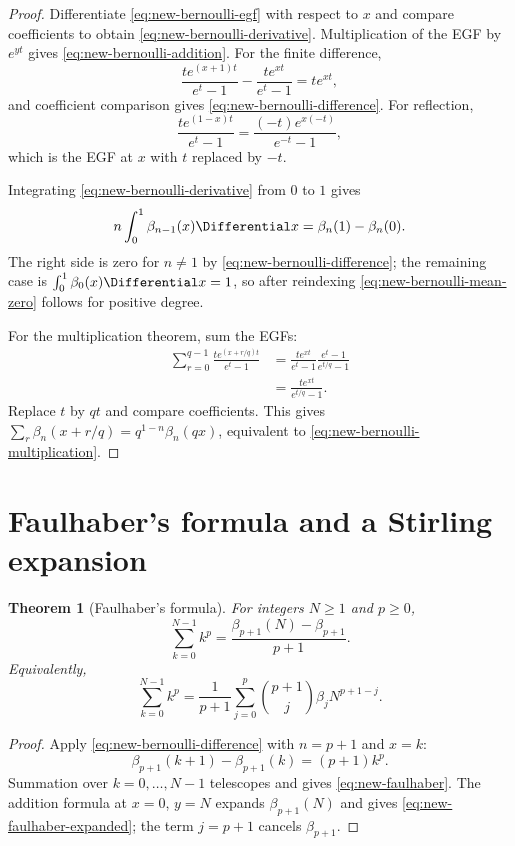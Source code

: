 \documentclass[11pt,a4paper,oneside,openany]{book}
\newtheorem{theorem}{Theorem}[chapter]
\theoremstyle{definition}
\theoremstyle{remark}
\begin{document}
\begin{proof}
Differentiate \eqref{eq:new-bernoulli-egf} with respect to $x$ and compare
coefficients to obtain \eqref{eq:new-bernoulli-derivative}.  Multiplication of
the EGF by $e^{yt}$ gives \eqref{eq:new-bernoulli-addition}.  For the finite
difference,
\[
 \frac{t e^{(x+1)t}}{e^t-1}-\frac{t e^{xt}}{e^t-1}=te^{xt},
\]
and coefficient comparison gives \eqref{eq:new-bernoulli-difference}.  For
reflection,
\[
 \frac{t e^{(1-x)t}}{e^t-1}
 =\frac{(-t)e^{x(-t)}}{e^{-t}-1},
\]
which is the EGF at $x$ with $t$ replaced by $-t$.

Integrating \eqref{eq:new-bernoulli-derivative} from $0$ to $1$ gives
\[
 n\int_0^1\beta_{n-1}(x)\Differential x=\beta_n(1)-\beta_n(0).
\]
The right side is zero for $n\ne1$ by
\eqref{eq:new-bernoulli-difference}; the remaining case is
$\int_0^1\beta_0(x)\Differential x=1$, so after reindexing
\eqref{eq:new-bernoulli-mean-zero} follows for positive degree.

For the multiplication theorem, sum the EGFs:
\begin{align*}
 \sum_{r=0}^{q-1}\frac{t e^{(x+r/q)t}}{e^t-1}
 &=\frac{t e^{xt}}{e^t-1}
   \frac{e^t-1}{e^{t/q}-1}\\
 &=\frac{t e^{xt}}{e^{t/q}-1}.
\end{align*}
Replace $t$ by $qt$ and compare coefficients.  This gives
$\sum_r\beta_n(x+r/q)=q^{1-n}\beta_n(qx)$, equivalent to
\eqref{eq:new-bernoulli-multiplication}.
\end{proof}

\section{Faulhaber's formula and a Stirling expansion}

\begin{theorem}[Faulhaber's formula]\label{thm:new-faulhaber}
For integers $N\ge1$ and $p\ge0$,
\begin{equation}\label{eq:new-faulhaber}
 \sum_{k=0}^{N-1}k^p
 =\frac{\beta_{p+1}(N)-\beta_{p+1}}{p+1}.
\end{equation}
Equivalently,
\begin{equation}\label{eq:new-faulhaber-expanded}
 \sum_{k=0}^{N-1}k^p
 =\frac1{p+1}\sum_{j=0}^{p}
 \binom{p+1}{j}\beta_jN^{p+1-j}.
\end{equation}
\end{theorem}

\begin{proof}
Apply \eqref{eq:new-bernoulli-difference} with $n=p+1$ and $x=k$:
\[
 \beta_{p+1}(k+1)-\beta_{p+1}(k)=(p+1)k^p.
\]
Summation over $k=0,\ldots,N-1$ telescopes and gives
\eqref{eq:new-faulhaber}.  The addition formula at $x=0$, $y=N$ expands
$\beta_{p+1}(N)$ and gives \eqref{eq:new-faulhaber-expanded}; the term
$j=p+1$ cancels $\beta_{p+1}$.
\end{proof}
\end{document}
